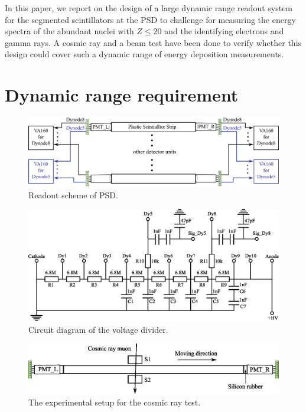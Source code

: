 \documentclass[5p, times]{elsarticle}
\begin{document}
In this paper, we report on the design of a large dynamic range readout system for the segmented scintillators at the PSD to challenge for measuring the energy spectra of the abundant nuclei with $Z\leq20$ and the identifying electrons and gamma rays. 
A cosmic ray and a beam test have been done to verify whether this design could cover such a dynamic range of energy deposition measurements.

\section{Dynamic range requirement}
\label{sec:requirement}

\begin{figure}
\centering
 \includegraphics[width=140mm]{readout_scheme}
\caption{Readout scheme of PSD.}
\label{fig:readout_scheme}
\end{figure} 

\begin{figure}
\centering
 \includegraphics[width=140mm]{divider}
\caption{Circuit diagram of the voltage divider.}
\label{fig:divider}
\end{figure} 

\begin{figure}[t]
 \centering
 \includegraphics[width=140mm]{cosmic_test}
\caption{The experimental setup for the cosmic ray test.}
\label{fig:cosmic_test}
\end{figure} 
\end{document}
